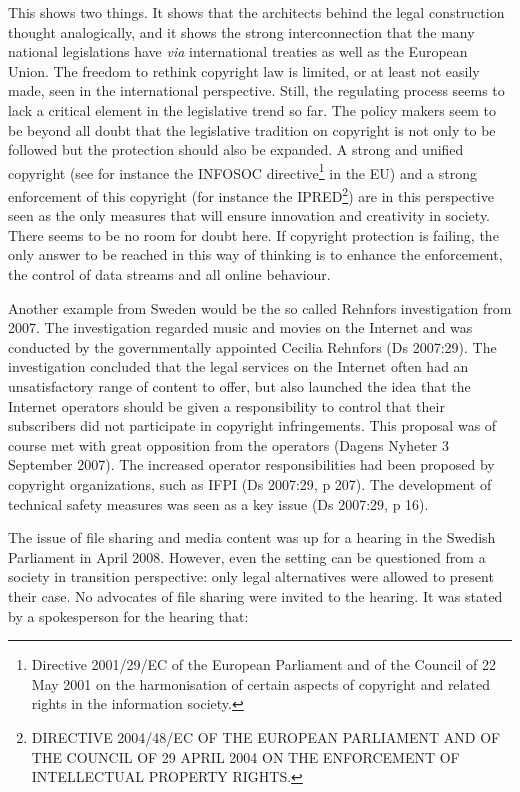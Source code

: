 This shows two things. It shows that the architects behind the legal
construction thought analogically, and it shows the strong interconnection that
the many national legislations have \textit{via} international treaties as well as the
European Union. The freedom to rethink copyright law is limited, or at least not
easily made, seen in the international perspective. Still, the regulating
process seems to lack a critical element in the legislative trend so far. The
policy makers seem to be beyond all doubt that the legislative tradition on
copyright is not only to be followed but the protection should also be expanded.
A strong and unif\hbox{}ied copyright (see for instance the INFOSOC
directive\footnote{Directive 2001/29/EC of the European Parliament and of the
Council of 22 May 2001 on the harmonisation of certain aspects of copyright and
related rights in the information society.} in the EU) and a strong enforcement
of this copyright (for instance the IPRED\footnote{DIRECTIVE 2004/48/EC OF THE
EUROPEAN PARLIAMENT AND OF THE COUNCIL OF 29 APRIL 2004 ON THE ENFORCEMENT OF
INTELLECTUAL PROPERTY RIGHTS.}) are in this perspective seen as the only
measures that will ensure innovation and creativity in society. There seems to
be no room for doubt here. If copyright protection is failing, the only answer
to be reached in this way of thinking is to enhance the enforcement, the control
of data streams and all online behaviour.

Another example from Sweden would be the so called Rehnfors investigation from
2007. The investigation regarded music and movies on the Internet and was
conducted by the governmentally appointed Cecilia Rehnfors (Ds 2007:29). The
investigation concluded that the legal services on the Internet often had an
unsatisfactory range of content to of\hbox{}fer, but also launched the idea that the
Internet operators should be given a responsibility to control that their
subscribers did not participate in copyright infringements. This proposal was of
course met with great opposition from the operators (Dagens Nyheter 3 September
2007). The increased operator responsibilities had been proposed by copyright
organizations, such as IFPI (Ds 2007:29, p 207). The development of technical
safety measures was seen as a key issue (Ds 2007:29, p 16).

The issue of f\hbox{}ile sharing and media content was up for a hearing in the Swedish
Parliament in April 2008. However, even the setting can be questioned from a
society in transition perspective: only legal alternatives were allowed to
present their case. No advocates of f\hbox{}ile sharing were invited to the hearing. It
was stated by a spokesperson for the hearing that:

